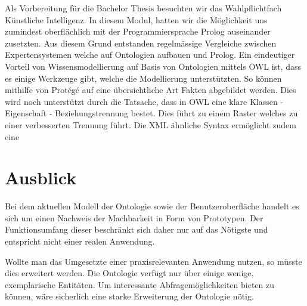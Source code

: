 Als Vorbereitung für die Bachelor Thesis besuchten wir das Wahlpflichtfach Künstliche Intelligenz. In diesem Modul, hatten wir die Möglichkeit uns zumindest oberflächlich mit der Programmiersprache Prolog auseinander zusetzten. Aus diesem Grund entstanden regelmässige Vergleiche zwischen Expertensystemen welche auf Ontologien aufbauen und Prolog. Ein eindeutiger Vorteil von Wissensmodellierung auf Basis von Ontologien mittels OWL ist, dass es einige Werkzeuge gibt, welche die Modellierung unterstützten. So können mithilfe von Protégé auf eine übersichtliche Art Fakten abgebildet werden. Dies wird noch unterstützt durch die Tatsache, dass in OWL eine klare Klassen - Eigenschaft - Beziehungstrennung bestet. Dies führt zu einem Raster welches zu einer verbesserten Trennung führt. Die XML ähnliche Syntax ermöglicht zudem eine\\ 



\section{Ausblick}
\label{sec:fazit_subchap}
Bei dem aktuellen Modell der Ontologie sowie der Benutzeroberfläche handelt es sich um einen Nachweis der Machbarkeit in Form von Prototypen. Der Funktionsumfang dieser beschränkt sich daher nur auf das Nötigste und entspricht nicht einer realen Anwendung.

Wollte man das Umgesetzte einer praxisrelevanten Anwendung nutzen, so müsste dies erweitert werden. Die Ontologie verfügt nur über einige wenige, exemplarische Entitäten. Um interessante Abfragemöglichkeiten bieten zu können, wäre sicherlich eine starke Erweiterung der Ontologie nötig.

